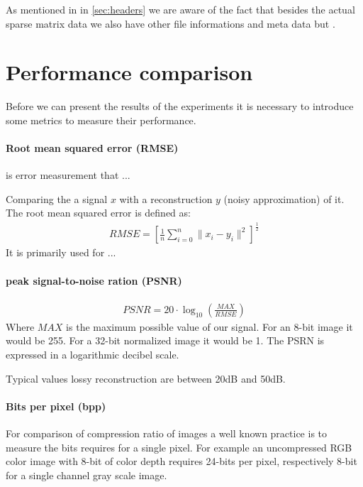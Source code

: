 As mentioned in in \ref{sec:headers} we are aware of the fact that besides
the actual sparse matrix data we also have other file informations and meta
data but .  

\section{Performance comparison}

Before we can present the results of the experiments it is necessary to
introduce some metrics to measure their performance.


\paragraph{Root mean squared error (RMSE)} is error measurement that ...

Comparing the a signal $x$ with a reconstruction $y$ (noisy approximation) of
it. The root mean squared error is defined as:
\begin{align}
 RMSE = \left[\frac{1}{n} \sum_{i=0}^{n}{\lVert x_i - y_i\rVert^{2}}
\right]^{\frac{1}{2}}
\end{align}
It is primarily used for ...

\paragraph{peak signal-to-noise ration (PSNR)}


\begin{align}
 PSNR = 20 \cdot \log_{10} \left(\frac{MAX}{RMSE}\right)
\end{align}
Where $MAX$ is the maximum possible value of our signal. For an 8-bit image it
would be 255. For a 32-bit normalized image it would be 1. The PSRN is expressed
in a logarithmic decibel scale.

Typical values lossy reconstruction are between 20dB and 50dB.




\paragraph{Bits per pixel (bpp)}
For comparison of compression ratio of images a well known practice is to
measure the bits requires for a single pixel. For example an uncompressed RGB
color image with 8-bit of color depth requires 24-bits per pixel, respectively
8-bit for a single channel gray scale image.

